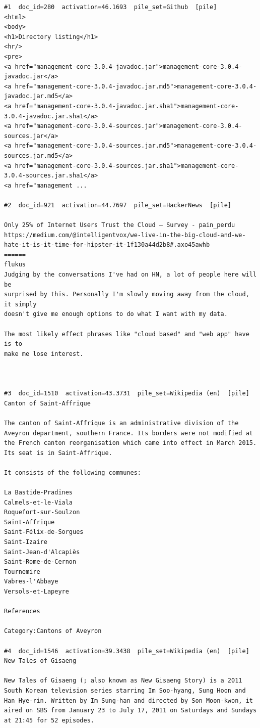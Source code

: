 \begin{verbatim}
#1  doc_id=280  activation=46.1693  pile_set=Github  [pile]
<html>
<body>
<h1>Directory listing</h1>
<hr/>
<pre>
<a href="management-core-3.0.4-javadoc.jar">management-core-3.0.4-javadoc.jar</a>
<a href="management-core-3.0.4-javadoc.jar.md5">management-core-3.0.4-javadoc.jar.md5</a>
<a href="management-core-3.0.4-javadoc.jar.sha1">management-core-3.0.4-javadoc.jar.sha1</a>
<a href="management-core-3.0.4-sources.jar">management-core-3.0.4-sources.jar</a>
<a href="management-core-3.0.4-sources.jar.md5">management-core-3.0.4-sources.jar.md5</a>
<a href="management-core-3.0.4-sources.jar.sha1">management-core-3.0.4-sources.jar.sha1</a>
<a href="management ...

#2  doc_id=921  activation=44.7697  pile_set=HackerNews  [pile]

Only 25% of Internet Users Trust the Cloud – Survey - pain_perdu
https://medium.com/@intelligentvox/we-live-in-the-big-cloud-and-we-hate-it-is-it-time-for-hipster-it-1f130a44d2b8#.axo45awhb
======
flukus
Judging by the conversations I've had on HN, a lot of people here will be
surprised by this. Personally I'm slowly moving away from the cloud, it simply
doesn't give me enough options to do what I want with my data.

The most likely effect phrases like "cloud based" and "web app" have is to
make me lose interest.



#3  doc_id=1510  activation=43.3731  pile_set=Wikipedia (en)  [pile]
Canton of Saint-Affrique

The canton of Saint-Affrique is an administrative division of the Aveyron department, southern France. Its borders were not modified at the French canton reorganisation which came into effect in March 2015. Its seat is in Saint-Affrique.

It consists of the following communes:
 
La Bastide-Pradines
Calmels-et-le-Viala
Roquefort-sur-Soulzon
Saint-Affrique
Saint-Félix-de-Sorgues
Saint-Izaire
Saint-Jean-d'Alcapiès
Saint-Rome-de-Cernon
Tournemire
Vabres-l'Abbaye
Versols-et-Lapeyre

References

Category:Cantons of Aveyron

#4  doc_id=1546  activation=39.3438  pile_set=Wikipedia (en)  [pile]
New Tales of Gisaeng

New Tales of Gisaeng (; also known as New Gisaeng Story) is a 2011 South Korean television series starring Im Soo-hyang, Sung Hoon and Han Hye-rin. Written by Im Sung-han and directed by Son Moon-kwon, it aired on SBS from January 23 to July 17, 2011 on Saturdays and Sundays at 21:45 for 52 episodes.


\end{verbatim}
